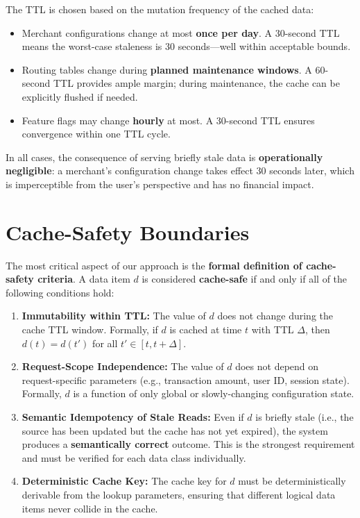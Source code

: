 \documentclass[12pt,a4paper]{report}
\begin{document}
The TTL is chosen based on the mutation frequency of the cached data:

\begin{itemize}
    \item Merchant configurations change at most \textbf{once per day}. A 30-second TTL means the worst-case staleness is 30 seconds—well within acceptable bounds.
    \item Routing tables change during \textbf{planned maintenance windows}. A 60-second TTL provides ample margin; during maintenance, the cache can be explicitly flushed if needed.
    \item Feature flags may change \textbf{hourly} at most. A 30-second TTL ensures convergence within one TTL cycle.
\end{itemize}

In all cases, the consequence of serving briefly stale data is \textbf{operationally negligible}: a merchant's configuration change takes effect 30 seconds later, which is imperceptible from the user's perspective and has no financial impact.

\section{Cache-Safety Boundaries}
\label{sec:safety}

The most critical aspect of our approach is the \textbf{formal definition of cache-safety criteria}. A data item $d$ is considered \textbf{cache-safe} if and only if all of the following conditions hold:

\begin{enumerate}
    \item \textbf{Immutability within TTL:} The value of $d$ does not change during the cache TTL window. Formally, if $d$ is cached at time $t$ with TTL $\Delta$, then $d(t) = d(t')$ for all $t' \in [t, t + \Delta]$.

    \item \textbf{Request-Scope Independence:} The value of $d$ does not depend on request-specific parameters (e.g., transaction amount, user ID, session state). Formally, $d$ is a function of only global or slowly-changing configuration state.

    \item \textbf{Semantic Idempotency of Stale Reads:} Even if $d$ is briefly stale (i.e., the source has been updated but the cache has not yet expired), the system produces a \textbf{semantically correct} outcome. This is the strongest requirement and must be verified for each data class individually.

    \item \textbf{Deterministic Cache Key:} The cache key for $d$ must be deterministically derivable from the lookup parameters, ensuring that different logical data items never collide in the cache.
\end{enumerate}
\end{document}
